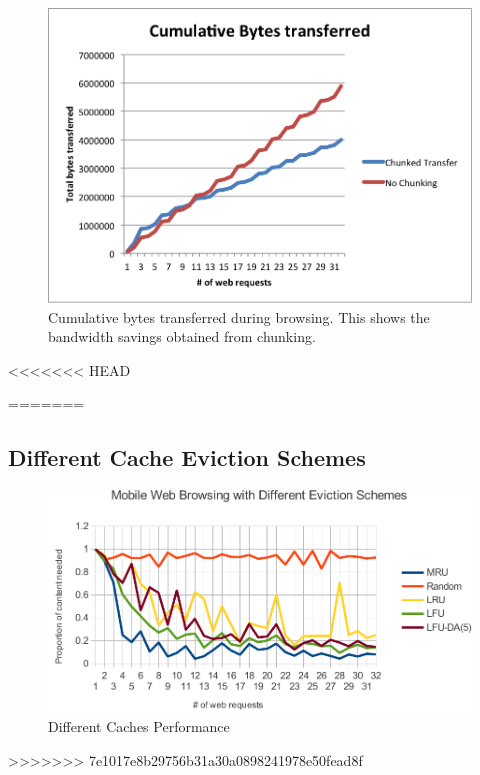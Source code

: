 \begin{figure}[h] 
\centering \includegraphics[scale=0.40]{images/cumulbrowsing.png}
\caption{Cumulative bytes transferred during browsing. This shows the bandwidth savings obtained from chunking.}
\end{figure}

<<<<<<< HEAD


=======
\subsection{Different Cache Eviction Schemes}

\begin{figure}[h]
\centering \includegraphics[scale=0.60]{images/caches.pdf}
\caption{Different Caches Performance}
\end{figure}
>>>>>>> 7e1017e8b29756b31a30a0898241978e50fead8f
